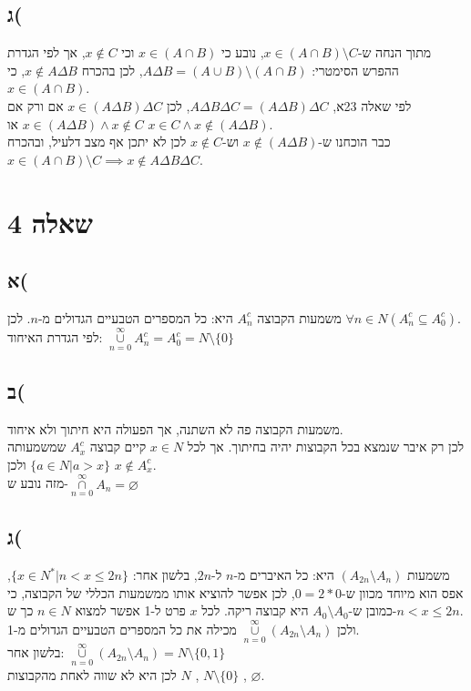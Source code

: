 \documentclass{article}
\begin{document}
\subsection*{ג(}
מתוך הנחה ש-$x \in (A \cap  B) \setminus C$, נובע כי $x \in (A \cap B) $ וכי $x \not\in C $, אך לפי הגדרת ההפרש הסימטרי: $A \Delta B = (A \cup  B) \setminus  (A \cap  B)$, לכן בהכרח $x \notin A \Delta B$, כי $x \in (A \cap B)$.  \\
לפי שאלה 23א, $A \Delta B \Delta  C = (A \Delta B) \Delta C$, לכן $x \in (A \Delta B) \Delta C$ אם ורק אם 
$x \in (A \Delta B) \land x \not\in C$ או $x \in C \land x \not\in (A \Delta B)$. \\
כבר הוכחנו ש-$x \not\in (A \Delta B)$ וש-$x \not\in C$ לכן לא יתכן אף מצב דלעיל, ובהכרח $x \in (A \cap  B) \setminus C \implies x \not\in A \Delta B \Delta C$.

\section*{שאלה 4}
\subsection*{א(}
משמעות הקבוצה  $A_n^{c}$ היא: כל המספרים הטבעיים הגדולים מ-$n$. לכן $\forall n \in N (A_n^{c} \subseteq A_0^{c})$.\\
לפי הגדרת האיחוד: $\underset{n=0}{\overset{\infty}{\cup }} A_n^{c} = A_0^{c} = N \setminus \{0\}$
  
\subsection*{ב(}

משמעות הקבוצה פה לא השתנה, אך הפעולה היא חיתוך ולא איחוד.\\
לכן רק איבר שנמצא בכל הקבוצות יהיה בחיתוך. אך לכל $x \in N$ קיים קבוצה  $A_x^{c}$ שמשמעותה $\{a \in N | a > x \}$ ולכן $x \not\in A_x^{c}$.\\
מזה נובע ש-$ \underset{n=0}{\overset{\infty}{\cap }} A_n = \varnothing$


\subsection*{ג(}
משמעות $(A_{2n} \setminus A_n)$ היא: כל האיברים מ-$n$ ל-$2n$, בלשון אחר: $\{x \in  N^{*} | n < x \le 2n \}$, 
אפס הוא מיוחד מכוון ש-$0 = 2*0$, לכן אפשר להוציא אותו ממשמעות הכללי של הקבוצה,
כי כמובן ש-$A_0 \setminus  A_0$ היא קבוצה ריקה. לכל $x$ פרט ל-1 אפשר למצוא $n \in N$ 
כך ש-$n < x \le 2n$.\\
ולכן $\underset{n=0}{\overset{\infty}{\cup }} (A_{2n} \setminus  A_n)$ מכילה את כל
המספרים הטבעיים הגדולים מ-1.\\
בלשון אחר: $\underset{n=0}{\overset{\infty}{\cup }} (A_{2n} \setminus  A_n) = N \setminus \{0,1\}$\\
לכן היא לא שווה לאחת מהקבוצות $N$ ,  $N \setminus \{0\}$ , $ \varnothing $.
\end{document}
